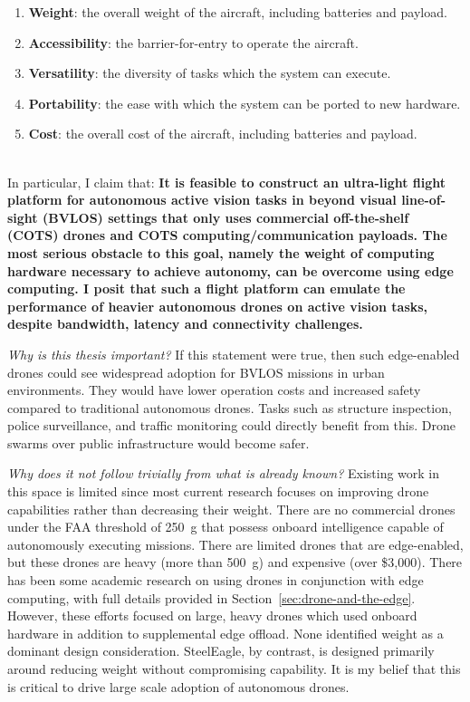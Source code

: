 \begin{enumerate}
\item \textbf{Weight}: the overall weight of the aircraft, including batteries and payload.
\item \textbf{Accessibility}: the barrier-for-entry to operate the aircraft. 
\item \textbf{Versatility}: the diversity of tasks which the system can execute.
\item \textbf{Portability}: the ease with which the system can be ported to new hardware.
\item \textbf{Cost}: the overall cost of the aircraft, including batteries and payload.
\end{enumerate}
\\
In particular, I claim that:
\newpage
\textbf{It is feasible to construct an ultra-light flight platform for autonomous active vision tasks in beyond visual line-of-sight (BVLOS) settings that only uses commercial off-the-shelf (COTS) drones and COTS computing/communication payloads. The most serious obstacle to this goal, namely the weight of computing hardware necessary to achieve autonomy, can be overcome using edge computing. I posit that such a flight platform can emulate the performance of heavier autonomous drones on active vision tasks, despite bandwidth, latency and connectivity challenges.}

\textit{Why is this thesis important?} If this statement were true, then such edge-enabled drones could see widespread adoption for BVLOS missions in urban environments. They would have lower operation costs and increased safety compared to traditional autonomous drones. Tasks such as structure inspection, police surveillance, and traffic monitoring could directly benefit from this. Drone swarms over public infrastructure would become safer.

\textit{Why does it not follow trivially from what is already known?} Existing work in this space is limited since most current research focuses on improving drone capabilities rather than decreasing their weight. There are no commercial drones under the FAA threshold of 250~g that possess onboard intelligence capable of autonomously executing  missions. There are limited drones that are edge-enabled, but these drones are heavy (more than 500~g) and expensive (over \$3,000). There has been some academic research on using drones in conjunction with edge computing, with full details provided in Section~\ref{sec:drone-and-the-edge}. However, these efforts focused on large, heavy drones which used onboard hardware in addition to supplemental edge offload. None identified weight as a dominant design consideration. SteelEagle, by contrast, is designed primarily around reducing weight without compromising capability. It is my belief that this is critical to drive large scale adoption of autonomous drones. 

